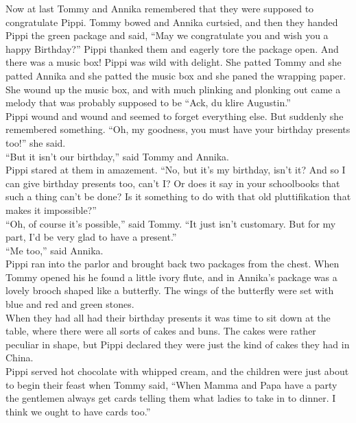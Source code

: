 \documentclass{standard}
\begin{document}
Now at last Tommy and Annika remembered that they were supposed to congratulate Pippi. Tommy bowed and Annika curtsied, and then they handed Pippi the green package and said, “May we congratulate you and wish you a happy Birthday?” Pippi thanked them and eagerly tore the package open. And there was a music box! Pippi was wild with delight. She patted Tommy and she patted Annika and she patted the music box and she paned the wrapping paper. She wound up the music box, and with much plinking and plonking out came a melody that was probably supposed to be “Ack, du klire Augustin.”\\

Pippi wound and wound and seemed to forget everything else. But suddenly she remembered something. “Oh, my goodness, you must have your birthday presents too!” she said.\\

“But it isn’t our birthday,” said Tommy and Annika.\\

Pippi stared at them in amazement. “No, but it’s my birthday, isn’t it? And so I can give birthday presents too, can’t I? Or does it say in your schoolbooks that such a thing can’t be done? Is it something to do with that old pluttifikation that makes it impossible?”\\

“Oh, of course it’s possible,” said Tommy. “It just isn’t customary. But for my part, I’d be very glad to have a present.”\\

“Me too,” said Annika.\\

Pippi ran into the parlor and brought back two packages from the chest. When Tommy opened his he found a little ivory flute, and in Annika’s package was a lovely brooch shaped like a butterfly. The wings of the butterfly were set with blue and red and green stones.\\

When they had all had their birthday presents it was time to sit down at the table, where there were all sorts of cakes and buns. The cakes were rather peculiar in shape, but Pippi declared they were just the kind of cakes they had in China.\\

Pippi served hot chocolate with whipped cream, and the children were just about to begin their feast when Tommy said, “When Mamma and Papa have a party the gentlemen always get cards telling them what ladies to take in to dinner. I think we ought to have cards too.”\\
\end{document}
